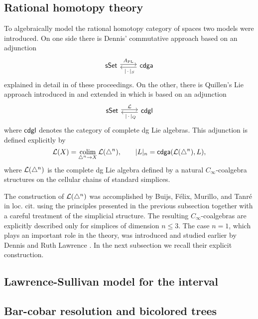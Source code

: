 \subsection{Rational homotopy theory} \label{ss:cdgl model}

To algebraically model the rational homotopy category of spaces two models were introduced.
On one side there is Dennis' commutative approach \cite{sullivan1977infinitesimal} based on an adjunction
\[
\begin{tikzcd}
\sSet \arrow[r, shift left=2pt, "A_{\mathrm{PL}}"] &
\cdga \arrow[l, shift left=2pt, "\ \bars{\,\cdot\,}_S"]
\end{tikzcd}
\]
explained in detail in \cite{bibid} of these proceedings.
On the other, there is Quillen's Lie approach introduced in \cite{quillen1969rational} and extended in \cite{buijs2013algebraicmodels, buijs2020liemodels} which is based on an adjunction
\[
\begin{tikzcd}
\sSet \arrow[r, shift left=2pt, "\cL"] &
\cdgl \arrow[l, shift left=2pt, "\ \bars{\,\cdot\,}_Q"]
\end{tikzcd}
\]
where $\mathsf{cdgl}$ denotes the category of complete dg Lie algebras.
This adjunction is defined explicitly by
\[
\mathcal{L}(X) = \operatorname*{colim}_{\triangle^n \to X} \mathcal{L}(\triangle^n), \qquad
\lvert L\rvert_n = \mathsf{cdga}(\mathcal{L}(\triangle^n), L),
\]
where $\mathcal{L}(\triangle^n)$ is the complete dg Lie algebra defined by a natural $C_\infty$-coalgebra structures on the cellular chains of standard simplices.

The construction of $\mathcal{L}(\triangle^n)$ was accomplished by Buijs, F{\'e}lix, Murillo, and Tanr{\'e} in loc. cit. using the principles presented in the previous subsection together with a careful treatment of the simplicial structure.
The resulting $C_\infty$-coalgebras are explicitly described only for simplices of dimension $n \leq 3$.
The case $n = 1$, which plays an important role in the theory, was introduced and studied earlier by Dennis and Ruth Lawrence \cite{lawrence2014interval}.
In the next subsection we recall their explicit construction.

\subsection{Lawrence-Sullivan model for the interval} \label{ss:LS interval}


\subsection{Bar-cobar resolution and bicolored trees}

